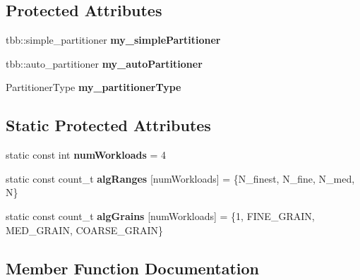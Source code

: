 \subsection*{Protected Attributes}
\begin{DoxyCompactItemize}
\item 
\hypertarget{classTest__Algs_ac1b0d3d7958df78e069f40804f061b47}{}tbb\+::simple\+\_\+partitioner {\bfseries my\+\_\+simple\+Partitioner}\label{classTest__Algs_ac1b0d3d7958df78e069f40804f061b47}

\item 
\hypertarget{classTest__Algs_a26111aa2d6cabf133a543a10b4230452}{}tbb\+::auto\+\_\+partitioner {\bfseries my\+\_\+auto\+Partitioner}\label{classTest__Algs_a26111aa2d6cabf133a543a10b4230452}

\item 
\hypertarget{classTest__Algs_a6c670aa4c90de6a31a9e7a030e51a175}{}Partitioner\+Type {\bfseries my\+\_\+partitioner\+Type}\label{classTest__Algs_a6c670aa4c90de6a31a9e7a030e51a175}

\end{DoxyCompactItemize}
\subsection*{Static Protected Attributes}
\begin{DoxyCompactItemize}
\item 
\hypertarget{classTest__Algs_a1690a5fde07543428bbe50e084097636}{}static const int {\bfseries num\+Workloads} = 4\label{classTest__Algs_a1690a5fde07543428bbe50e084097636}

\item 
\hypertarget{classTest__Algs_a5fbd443d987a0d6fb767beeaaa73621e}{}static const count\+\_\+t {\bfseries alg\+Ranges} \mbox{[}num\+Workloads\mbox{]} = \{N\+\_\+finest, N\+\_\+fine, N\+\_\+med, N\}\label{classTest__Algs_a5fbd443d987a0d6fb767beeaaa73621e}

\item 
\hypertarget{classTest__Algs_a72ab1b8d620215cb381f057c3b55c0ee}{}static const count\+\_\+t {\bfseries alg\+Grains} \mbox{[}num\+Workloads\mbox{]} = \{1, F\+I\+N\+E\+\_\+\+G\+R\+A\+I\+N, M\+E\+D\+\_\+\+G\+R\+A\+I\+N, C\+O\+A\+R\+S\+E\+\_\+\+G\+R\+A\+I\+N\}\label{classTest__Algs_a72ab1b8d620215cb381f057c3b55c0ee}

\end{DoxyCompactItemize}


\subsection{Member Function Documentation}
\hypertarget{classTest__Algs_a18ccd1cedb43cdbb4fce546a1abba490}{}
